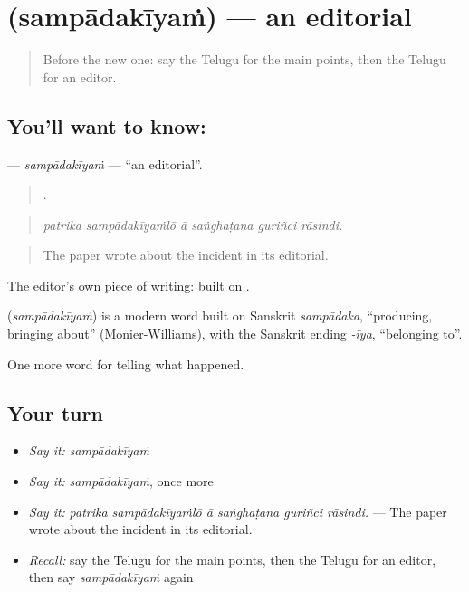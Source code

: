 \section[\texorpdfstring{\te{సంపాదకీయం} (sampādakīyaṁ)}{సంపాదకీయం (sampādakīyaṁ)}]{ (sampādakīyaṁ) — an editorial}

\label{lesson:TE-C341-sampadakiyam}



\begin{quote}
Before the new one: say the Telugu for the main points, then the Telugu for an editor.
\end{quote}

\subsection*{You'll want to know: }
\textbf{} — \emph{sampādakīyaṁ} — \textquotedblleft{}an editorial\textquotedblright{}.

\begin{quote}
     .
\end{quote}

\begin{quote}
\emph{patrika sampādakīyaṁlō ā saṅghaṭana guriñci rāsindi.}
\end{quote}

\begin{quote}
The paper wrote about the incident in its editorial.
\end{quote}

The editor's own piece of writing: built on .

\begin{cousinweb}
\textbf{} (\emph{sampādakīyaṁ}) is a modern word built on Sanskrit \emph{sampādaka}, \textquotedblleft{}producing, bringing about\textquotedblright{} (Monier-Williams), with the Sanskrit ending \emph{-īya}, \textquotedblleft{}belonging to\textquotedblright{}.
\end{cousinweb}

\begin{grammarlens}[title={What you've built}]
One more word for telling what happened.
\end{grammarlens}

\subsection*{Your turn}
\begin{itemize}
\raggedright
  \item \emph{Say it:} \emph{sampādakīyaṁ}
  \item \emph{Say it:} \emph{sampādakīyaṁ}, once more
  \item \emph{Say it:} \emph{patrika sampādakīyaṁlō ā saṅghaṭana guriñci rāsindi.} — The paper wrote about the incident in its editorial.
  \item \emph{Recall:} say the Telugu for the main points, then the Telugu for an editor, then say \emph{sampādakīyaṁ} again
\end{itemize}

